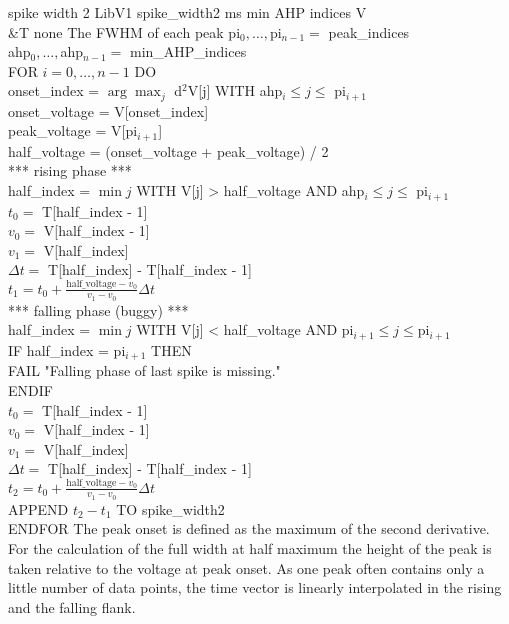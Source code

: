 \begin{efeature}
  {spike width 2}
  {LibV1}
  {spike\_width2}
  {ms}
  {min AHP indices}
  {V\\&T}
  {none}
  {The FWHM of each peak}
  {
  pi$_0, \ldots, $pi$_{n-1} =$ peak\_indices \\
  ahp$_0, \ldots, $ahp$_{n-1} =$ min\_AHP\_indices \\
  FOR $i = 0, \dots, n - 1$ DO \+ \\
    onset\_index = $\arg\max_j$ d$^2$V[j] WITH ahp$_i \le j \le$ pi$_{i+1}$ \\
    onset\_voltage = V[onset\_index] \\
    peak\_voltage = V[pi$_{i+1}$] \\
    half\_voltage = (onset\_voltage + peak\_voltage) / 2 \\
    *** rising phase *** \\
    half\_index = $\min j$ WITH V[j] > half\_voltage AND ahp$_i \le j \le$ pi$_{i+1}$ \\
    $t_0 =$ T[half\_index - 1] \\
    $v_0 =$ V[half\_index - 1] \\
    $v_1 =$ V[half\_index] \\
    $\Delta t =$ T[half\_index] - T[half\_index - 1] \\
    $t_1 = t_0 + \frac{\textrm{half\_voltage} - v_0}{v_1 - v_0} \Delta t$ \\
    *** falling phase (buggy) *** \\
    half\_index = $\min j$ WITH V[j] < half\_voltage AND pi$_{i+1} \le j \le $pi$_{i+1}$ \\
    IF half\_index = pi$_{i+1}$ THEN \+ \\
      FAIL "Falling phase of last spike is missing." \- \\
    ENDIF \\
    $t_0 =$ T[half\_index - 1] \\
    $v_0 =$ V[half\_index - 1] \\
    $v_1 =$ V[half\_index] \\
    $\Delta t =$ T[half\_index] - T[half\_index - 1] \\
    $t_2 = t_0 + \frac{\textrm{half\_voltage} - v_0}{v_1 - v_0} \Delta t$ \\
    APPEND $t_2 - t_1$ TO spike\_width2 \- \\
  ENDFOR
  }
  The peak onset is defined as the maximum of the second derivative.
  For the calculation of the full width at half maximum the height of the peak is taken relative to the voltage at peak onset.
  As one peak often contains only a little number of data points, the time vector is linearly interpolated in the rising and the falling flank.
  
\end{efeature}

